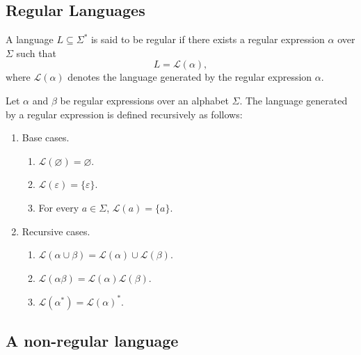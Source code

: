 \documentclass[10pt,a4paper]{article}
\begin{document}
\subsection{Regular Languages}

\begin{definition}
A language $L\subseteq\Sigma^*$ is said to be \textsf{regular} if there exists a regular expression $\alpha$ over $\Sigma$ such that
\[
    L=\mathcal{L}(\alpha),
\]
where $\mathcal{L}(\alpha)$ denotes the language generated by the regular expression $\alpha$.
\end{definition}

\begin{definition}
Let $\alpha$ and $\beta$ be regular expressions over an alphabet $\Sigma$. The language generated by a regular expression is defined recursively as follows:

\begin{enumerate}
    \item \textcolor{violet!70!black}{\textsf{Base cases.}}
    \begin{enumerate}
        \item[\textcolor{violet!70!black}{\textsf{B1.}}] $\mathcal{L}(\varnothing)=\varnothing$.

        \item[\textcolor{violet!70!black}{\textsf{B2.}}] $\mathcal{L}(\varepsilon)=\{\varepsilon\}$.

        \item[\textcolor{violet!70!black}{\textsf{B3.}}] For every $a\in\Sigma$, $\mathcal{L}(a)=\{a\}$.
    \end{enumerate}

    \item \textcolor{violet!70!black}{\textsf{Recursive cases.}}
    \begin{enumerate}
        \item[\textcolor{violet!70!black}{\textsf{R1.}}] $\mathcal{L}(\alpha\cup\beta)=\mathcal{L}(\alpha)\cup\mathcal{L}(\beta)$.

        \item[\textcolor{violet!70!black}{\textsf{R2.}}] $\mathcal{L}(\alpha\beta)=\mathcal{L}(\alpha)\mathcal{L}(\beta)$.

        \item[\textcolor{violet!70!black}{\textsf{R3.}}] $\mathcal{L}(\alpha^*)=\mathcal{L}(\alpha)^*$.
    \end{enumerate}
\end{enumerate}
\end{definition}

\subsection{A non-regular language}
\end{document}
